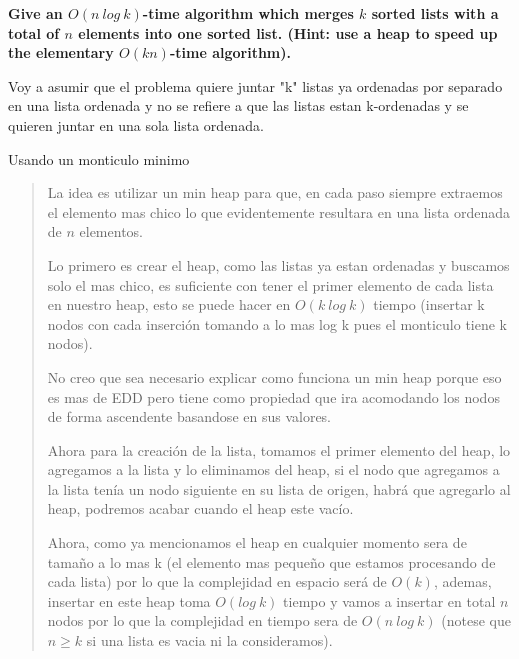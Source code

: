 \textbf{Give an $O(n \ log \ k)$-time algorithm which merges $k$ sorted lists with a total of $n$ elements into one sorted list. (Hint: use a heap to speed up the elementary $O(kn)$-time algorithm).}\vspace{.2cm}

Voy a asumir que el problema quiere juntar "k" listas ya ordenadas por separado en una lista ordenada y no se refiere a que las listas estan k-ordenadas y se quieren juntar en una sola lista ordenada. \vspace{.2cm}

\textcolor{bibi}{Usando un monticulo minimo}
\begin{quote}
    La idea es utilizar un min heap para que, en cada paso siempre extraemos el elemento mas chico lo que evidentemente resultara en una lista ordenada de $n$ elementos. \vspace{.2cm}

    Lo primero es crear el heap, como las listas ya estan ordenadas y buscamos solo el mas chico, es suficiente con tener el primer elemento de cada lista en nuestro heap, esto se puede hacer en $O(k  \ log \ k)$ tiempo (insertar k nodos con cada inserción tomando a lo mas log k pues el monticulo tiene k nodos). \vspace{.2cm}

    No creo que sea necesario explicar como funciona un min heap porque eso es mas de EDD pero tiene como propiedad que ira acomodando los nodos de forma ascendente basandose en sus valores. \vspace{.2cm}

    Ahora para la creación de la lista, tomamos el primer elemento del heap, lo agregamos a la lista y lo eliminamos del heap, si el nodo que agregamos a la lista tenía un nodo siguiente en su lista de origen, habrá que agregarlo al heap, podremos acabar cuando el heap este vacío. \vspace{.2cm}

    Ahora, como ya mencionamos el heap en cualquier momento sera de tamaño a lo mas k (el elemento mas pequeño que estamos procesando de cada lista) por lo que la complejidad en espacio será de $O(k)$, ademas, insertar en este heap toma $O(log \ k)$ tiempo y vamos a insertar en total $n$ nodos por lo que la complejidad en tiempo sera de $O(n \ log \ k)$ (notese que $n \geq k$ si una lista es vacia ni la consideramos).
    \vspace{.2cm}
\end{quote}